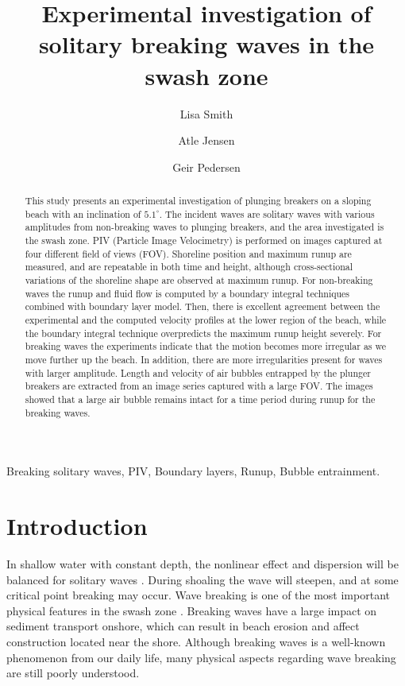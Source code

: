 \documentclass[review, authoryear]{elsarticle}
\begin{document}
\begin{frontmatter}
\title{Experimental investigation of solitary breaking waves in the swash zone}
\author[1]{Lisa Smith}	
\author[1]{Atle Jensen}
\author[1]{Geir Pedersen}

\address[1]{ Department of Mathematics, University of Oslo, Norway}



\setlength{\marginparwidth}{1.1cm}

\begin{abstract}
This study presents an experimental investigation of plunging breakers on a sloping beach with an inclination of $5.1^{\circ}$. The incident waves are solitary waves with various amplitudes from non-breaking waves to plunging breakers, and the area investigated is the swash zone. PIV (Particle Image Velocimetry) is performed on images captured at four different field of views (FOV). Shoreline position and maximum runup are measured, and are repeatable in both time and height, although cross-sectional variations of the shoreline shape are observed at maximum runup. For non-breaking waves the runup and fluid flow is computed by
a boundary integral techniques
combined with boundary layer model.
Then, there is excellent agreement between the experimental and the computed 
velocity profiles at the lower region of the beach, while the boundary integral technique overpredicts the maximum runup height severely. 
For breaking waves the experiments indicate that the motion becomes more irregular as we move further up the beach. In addition, there are more irregularities present  for waves with larger amplitude. Length and velocity of air bubbles entrapped by the plunger breakers are extracted from an image series captured with a large FOV. The images showed that a large air bubble remains intact for a time period during runup for the breaking waves. \\

\end{abstract}


\begin{keyword}
Breaking solitary waves, PIV, Boundary layers, Runup, Bubble entrainment.
\end{keyword}

\end{frontmatter}

\linenumbers

\section{Introduction}
In shallow water with constant depth, the nonlinear effect and dispersion will be balanced for solitary waves \citep{peregrine1983breaking}. During shoaling the wave will steepen, and at some critical  point breaking may occur. Wave breaking is one of the most important physical features in the swash zone \citep{elfrink2002hydrodynamics}. Breaking waves have a large impact on sediment transport onshore, which can result in beach erosion  and affect construction located near the shore. Although breaking waves is a well-known phenomenon from our daily life, many physical aspects regarding wave breaking are still poorly understood.
\end{document}
